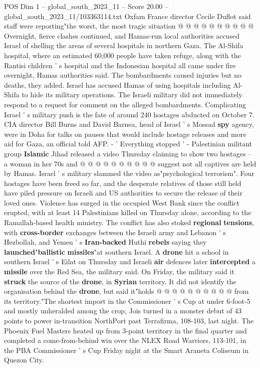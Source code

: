 \begin{textsample}{POS Dim 1 – global\_south\_2023\_11 – Score 20.00 – global\_south\_2023\_11/103363114.txt}
Oxfam France director Cecile Duflot said staff were reporting"the worst, the most tragic situation @ @ @ @ @ @ @ @ @ @ Overnight, fierce clashes continued, and Hamas-run local authorities accused Israel of shelling the areas of several hospitals in northern Gaza.
The Al-Shifa hospital, where an estimated 60,000 people have taken refuge, along with the Rantisi children ' s hospital and the Indonesian hospital all came under fire overnight, Hamas authorities said.
The bombardments caused injuries but no deaths, they added.
Israel has accused Hamas of using hospitals including Al-Shifa to hide its military operations.
The Israeli military did not immediately respond to a request for comment on the alleged bombardments.
Complicating Israel ' s military push is the fate of around 240 hostages abducted on October 7.
CIA director Bill Burns and David Barnea, head of Israel ' s Mossad \textbf{spy} agency, were in Doha for talks on pauses that would include hostage releases and more aid for Gaza, an official told AFP. - ' Everything stopped ' - Palestinian militant group \textbf{Islamic} Jihad released a video Thursday claiming to show two hostages -- a woman in her 70s and @ @ @ @ @ @ @ @ @ @ suggest not all captives are held by Hamas.
Israel ' s military slammed the video as"psychological terrorism".
Four hostages have been freed so far, and the desperate relatives of those still held have piled pressure on Israeli and US authorities to secure the release of their loved ones.
Violence has surged in the occupied West Bank since the conflict erupted, with at least 14 Palestinians killed on Thursday alone, according to the Ramallah-based health ministry.
The conflict has also stoked \textbf{regional} \textbf{tensions}, with \textbf{cross-border} exchanges between the Israeli army and Lebanon ' s Hezbollah, and Yemen ' s \textbf{Iran-backed} Huthi \textbf{rebels} saying they \textbf{launched}"\textbf{ballistic} \textbf{missiles}"at southern Israel.
A \textbf{drone} hit a school in southern Israel ' s Eilat on Thursday and Israeli \textbf{air} defences later \textbf{intercepted} a \textbf{missile} over the Red Sea, the military said.
On Friday, the military said it \textbf{struck} the source of the \textbf{drone}, in \textbf{Syrian} territory.
It did not identify the organisation behind the \textbf{drone}, but said it"holds @ @ @ @ @ @ @ @ @ @ from its territory."The shortest import in the Commissioner ' s Cup at under 6-foot-5 and mostly unheralded among the crop, Jois turned in a monster debut of 43 points to power in-transition NorthPort past Terrafirma, 108-103, last night.
The Phoenix Fuel Masters heated up from 3-point territory in the final quarter and completed a come-from-behind win over the NLEX Road Warriors, 113-101, in the PBA Commissioner ' s Cup Friday night at the Smart Araneta Coliseum in Quezon City.

\end{textsample}
